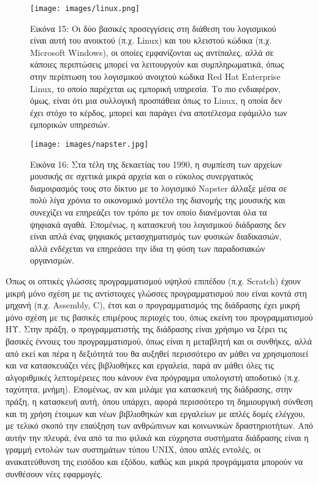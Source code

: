 \documentclass[
]{article}
\begin{document}
\leavevmode{}%
\begin{figure}
\hypertarget{fig:linux}{%
\centering
\texttt{[image: images/linux.png]}
\caption{Εικόνα 15: Οι δύο βασικές προσεγγίσεις στη διάθεση του
λογισμικού είναι αυτή του ανοικτού (π.χ. Linux) και του κλειστού κώδικα
(π.χ. Microsoft Windows), οι οποίες εμφανίζονται ως αντίπαλες, αλλά σε
κάποιες περιπτώσεις μπορεί να λειτουργούν και συμπληρωματικά, όπως στην
περίπτωση του λογισμικού ανοιχτού κώδικα Red Hat Enterprise Linux, το
οποίο παρέχεται ως εμπορική υπηρεσία. Το πιο ενδιαφέρον, όμως, είναι ότι
μια συλλογική προσπάθεια όπως το Linux, η οποία δεν έχει στόχο το
κέρδος, μπορεί και παράγει ένα αποτέλεσμα εφάμιλλο των εμπορικών
υπηρεσιών.}\label{fig:linux}
}
\end{figure}

\leavevmode{}%
\begin{figure}
\hypertarget{fig:napster}{%
\centering
\texttt{[image: images/napster.jpg]}
\caption{Εικόνα 16: Στα τέλη της δεκαετίας του 1990, η συμπίεση των
αρχείων μουσικής σε σχετικά μικρά αρχεία και ο εύκολος συνεργατικός
διαμοιρασμός τους στο δίκτυο με το λογισμικό Napster άλλαξε μέσα σε πολύ
λίγα χρόνια το οικονομικό μοντέλο της διανομής της μουσικής και
συνεχίζει να επηρεάζει τον τρόπο με τον οποίο διανέμονται όλα τα ψηφιακά
αγαθά. Επομένως, η κατασκευή του λογισμικού διάδρασης δεν είναι απλά
ένας ψηφιακός μετασχηματισμός των φυσικών διαδικασιών, αλλά ενδέχεται να
επηρεάσει την ίδια τη φύση των παραδοσιακών
οργανισμών.}\label{fig:napster}
}
\end{figure}

Όπως οι οπτικές γλώσσες προγραμματισμού υψηλού επιπέδου (π.χ. Scratch)
έχουν μικρή μόνο σχέση με τις αντίστοιχες γλώσσες προγραμματισμού που
είναι κοντά στη μηχανή (π.χ. Assembly, C), έτσι και ο προγραμματισμός
της διάδρασης έχει μικρή μόνο σχέση με τις βασικές επιμέρους περιοχές
του, όπως εκείνη του προγραμματισμού ΗΥ. Στην πράξη, ο προγραμματιστής
της διάδρασης είναι χρήσιμο να ξέρει τις βασικές έννοιες του
προγραμματισμού, όπως είναι η μεταβλητή και οι συνθήκες, αλλά από εκεί
και πέρα η δεξιότητά του θα αυξηθεί περισσότερο αν μάθει να χρησιμοποιεί
και να κατασκευάζει νέες βιβλιοθήκες και εργαλεία, παρά αν μάθει όλες
τις αλγοριθμικές λεπτομέρειες που κάνουν ένα πρόγραμμα υπολογιστή
αποδοτικό (π.χ. ταχύτητα, μνήμη). Επομένως, αν και μιλάμε για κατασκευή
της διάδρασης, στην πράξη, η κατασκευή αυτή, όπου υπάρχει, αφορά
περισσότερο τη δημιουργική σύνθεση και τη χρήση έτοιμων και νέων
βιβλιοθηκών και εργαλείων με απλές δομές ελέγχου, με τελικό σκοπό την
επαύξηση των ανθρώπινων και κοινωνικών δραστηριοτήτων. Από αυτήν την
πλευρά, ένα από τα πιο φιλικά και εύχρηστα συστήματα διάδρασης είναι η
γραμμή εντολών των συστημάτων τύπου UNIX, όπου απλές εντολές, οι
ανακατεύθυνση της εισόδου και εξόδου, καθώς και μικρά προγράμματα
μπορούν να συνθέσουν νέες εφαρμογές.
\end{document}
